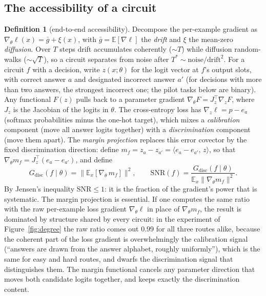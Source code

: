 \documentclass[10pt]{article}
\theoremstyle{definition}
\newtheorem{definition}{Definition}
\begin{document}
\subsection{The accessibility of a circuit}

\begin{definition}[end-to-end accessibility]\label{def:gdisc}
Decompose the per-example gradient as $\nabla_\theta \ell(x) = \bar g + \xi(x)$, with $\bar g = \mathbb{E}[\nabla \ell]$ the \emph{drift} and $\xi$ the mean-zero \emph{diffusion}. Over $T$ steps drift accumulates coherently ($\sim T$) while diffusion random-walks ($\sim \sqrt T$), so a circuit separates from noise after $T^* \sim \mathrm{noise}/\mathrm{drift}^2$. For a circuit $f$ with a decision, write $z(x;\theta)$ for the logit vector at $f$'s output slots, with correct answer $a$ and designated incorrect answer $a'$ (for decisions with more than two answers, the strongest incorrect one; the pilot tasks below are binary). Any functional $F(z)$ pulls back to a parameter gradient $\nabla_\theta F = J_z^{\top} \nabla_z F$, where $J_z$ is the Jacobian of the logits in $\theta$. The cross-entropy loss has $\nabla_z \ell = p - e_a$ (softmax probabilities minus the one-hot target), which mixes a \emph{calibration} component (move all answer logits together) with a \emph{discrimination} component (move them apart). The \emph{margin projection} replaces this error covector by the fixed discrimination direction: define $m_f = z_a - z_{a'} = \langle e_a - e_{a'},\, z\rangle$, so that $\nabla_\theta m_f = J_z^{\top}(e_a - e_{a'})$, and define
$$G_{\mathrm{disc}}(f \mid \theta) = \big\| \mathbb{E}_x[\nabla_\theta\, m_f] \big\|^2, \qquad \mathrm{SNR}(f) = \frac{G_{\mathrm{disc}}(f \mid \theta)}{\mathbb{E}_x \|\nabla_\theta m_f\|^2}.$$
By Jensen's inequality $\mathrm{SNR} \le 1$: it is the fraction of the gradient's power that is systematic. The margin projection is essential. If one computes the same ratio with the raw per-example loss gradient $\nabla_\theta \ell$ in place of $\nabla_\theta m_f$, the result is dominated by structure shared by every circuit: in the experiment of Figure~\ref{fig:degree} the raw ratio comes out $0.99$ for all three routes alike, because the coherent part of the loss gradient is overwhelmingly the calibration signal (``answers are drawn from the answer alphabet, roughly uniformly''), which is the same for easy and hard routes, and dwarfs the discrimination signal that distinguishes them. The margin functional cancels any parameter direction that moves both candidate logits together, and keeps exactly the discrimination content.
\end{definition}
\end{document}
